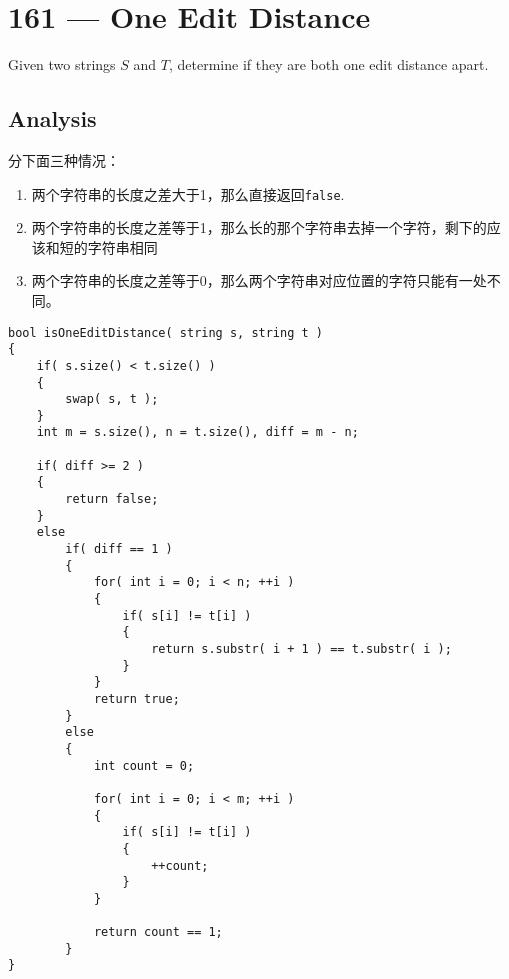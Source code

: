 \section{161 --- One Edit Distance}
Given two strings $S$ and $T$, determine if they are both one edit distance apart.
\subsection{Analysis}
\begin{CJK*}{UTF8}{gbsn}
分下面三种情况：
\begin{enumerate}
\item 两个字符串的长度之差大于1，那么直接返回\texttt{false}.
\item 两个字符串的长度之差等于1，那么长的那个字符串去掉一个字符，剩下的应该和短的字符串相同
\item 两个字符串的长度之差等于0，那么两个字符串对应位置的字符只能有一处不同。
\end{enumerate}
\end{CJK*}
\setcounter{lstlisting}{0}
\begin{lstlisting}[style=customc, caption={Reference Code}]
bool isOneEditDistance( string s, string t )
{
    if( s.size() < t.size() )
    {
        swap( s, t );
    }
    int m = s.size(), n = t.size(), diff = m - n;

    if( diff >= 2 )
    {
        return false;
    }
    else
        if( diff == 1 )
        {
            for( int i = 0; i < n; ++i )
            {
                if( s[i] != t[i] )
                {
                    return s.substr( i + 1 ) == t.substr( i );
                }
            }
            return true;
        }
        else
        {
            int count = 0;
            
            for( int i = 0; i < m; ++i )
            {
                if( s[i] != t[i] )
                {
                    ++count;
                }
            }

            return count == 1;
        }
}
\end{lstlisting}